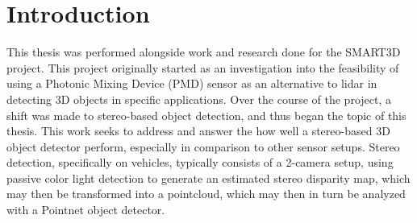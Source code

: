 \section{Introduction}
This thesis was performed alongside work and research done for the SMART3D project. This project originally started as an investigation into the feasibility of using a Photonic Mixing Device (PMD) sensor as an alternative to lidar in detecting 3D objects in specific applications. Over the course of the project, a shift was made to stereo-based object detection, and thus began the topic of this thesis. This work seeks to address and answer the how well a stereo-based 3D object detector perform, especially in comparison to other sensor setups. Stereo detection, specifically on vehicles, typically consists of a 2-camera setup, using passive color light detection to generate an estimated stereo disparity map, which may then be transformed into a pointcloud, which may then in turn be analyzed with a Pointnet object detector.



